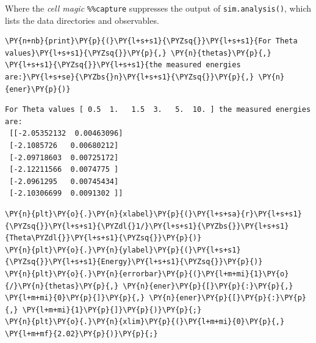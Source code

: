     Where the \emph{cell magic} \texttt{\%\%capture} suppresses the output
of \texttt{sim.analysis()}, which lists the data directories and
observables.

    \begin{tcolorbox}[breakable, size=fbox, boxrule=1pt, pad at break*=1mm,colback=cellbackground, colframe=cellborder]
\begin{Verbatim}[commandchars=\\\{\}]
\PY{n+nb}{print}\PY{p}{(}\PY{l+s+s1}{\PYZsq{}}\PY{l+s+s1}{For Theta values}\PY{l+s+s1}{\PYZsq{}}\PY{p}{,} \PY{n}{thetas}\PY{p}{,} \PY{l+s+s1}{\PYZsq{}}\PY{l+s+s1}{the measured energies are:}\PY{l+s+se}{\PYZbs{}n}\PY{l+s+s1}{\PYZsq{}}\PY{p}{,} \PY{n}{ener}\PY{p}{)}
\end{Verbatim}
\end{tcolorbox}

    \begin{Verbatim}[commandchars=\\\{\}]
For Theta values [ 0.5  1.   1.5  3.   5.  10. ] the measured energies are:
 [[-2.05352132  0.00463096]
 [-2.1085726   0.00680212]
 [-2.09718603  0.00725172]
 [-2.12211566  0.0074775 ]
 [-2.0961295   0.00745434]
 [-2.10306699  0.0091302 ]]
    \end{Verbatim}

    \begin{tcolorbox}[breakable, size=fbox, boxrule=1pt, pad at break*=1mm,colback=cellbackground, colframe=cellborder]
\begin{Verbatim}[commandchars=\\\{\}]
\PY{n}{plt}\PY{o}{.}\PY{n}{xlabel}\PY{p}{(}\PY{l+s+sa}{r}\PY{l+s+s1}{\PYZsq{}}\PY{l+s+s1}{\PYZdl{}1/}\PY{l+s+s1}{\PYZbs{}}\PY{l+s+s1}{Theta\PYZdl{}}\PY{l+s+s1}{\PYZsq{}}\PY{p}{)}
\PY{n}{plt}\PY{o}{.}\PY{n}{ylabel}\PY{p}{(}\PY{l+s+s1}{\PYZsq{}}\PY{l+s+s1}{Energy}\PY{l+s+s1}{\PYZsq{}}\PY{p}{)}
\PY{n}{plt}\PY{o}{.}\PY{n}{errorbar}\PY{p}{(}\PY{l+m+mi}{1}\PY{o}{/}\PY{n}{thetas}\PY{p}{,} \PY{n}{ener}\PY{p}{[}\PY{p}{:}\PY{p}{,} \PY{l+m+mi}{0}\PY{p}{]}\PY{p}{,} \PY{n}{ener}\PY{p}{[}\PY{p}{:}\PY{p}{,} \PY{l+m+mi}{1}\PY{p}{]}\PY{p}{)}\PY{p}{;}
\PY{n}{plt}\PY{o}{.}\PY{n}{xlim}\PY{p}{(}\PY{l+m+mi}{0}\PY{p}{,} \PY{l+m+mf}{2.02}\PY{p}{)}\PY{p}{;}
\end{Verbatim}
\end{tcolorbox}

    \begin{center}
    \end{center}
    { \hspace*{\fill} \\}
    
